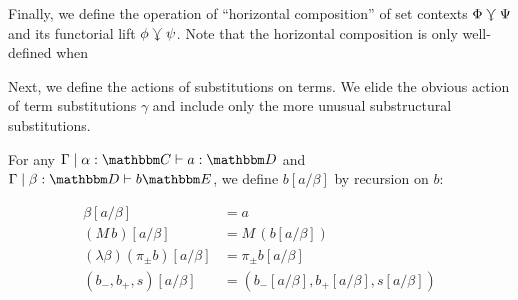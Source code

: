 \documentclass{llncs}
\begin{document}
Finally, we define the operation of ``horizontal composition'' of set
contexts $\Phi \curlyveedownarrow \Psi$ and its functorial lift $\phi \curlyveedownarrow
\psi$. Note that the horizontal composition is only well-defined when 

Next, we define the actions of substitutions on terms. We elide the
obvious action of term substitutions $\gamma$ and include only the
more unusual substructural substitutions.
\begin{definition}
  For any $\Gamma \pipe \alpha: \cat C \vdash a : \cat D$ and $\Gamma
  \pipe \beta:\cat D \vdash b \cat E$, we define $b[a/\beta]$ by
  recursion on $b$:

  \begin{align*}
    \beta[a/\beta] &= a\\
    (M\,b)[a/\beta] &= M\,(b[a/\beta])\\
    (\lambda \beta)    
    (\pi_\pm b)[a/\beta] &= \pi_\pm b[a/\beta]\\
    (b_-,b_+,s)[a/\beta] &= (b_-[a/\beta],b_+[a/\beta], s[a/\beta])\\
  \end{align*}


\end{definition}
\end{document}
